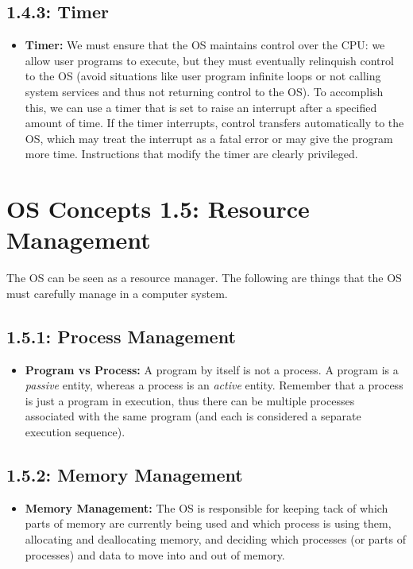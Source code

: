 \documentclass[12pt]{article}
\begin{document}
\subsection*{1.4.3: Timer}

\begin{itemize}
    \item \textbf{Timer:} We must ensure that the OS maintains control over the CPU: we allow user programs to execute, but they must eventually relinquish control to the OS (avoid situations like user program infinite loops or not calling system services and thus not returning control to the OS). To accomplish this, we can use a timer that is set to raise an interrupt after a specified amount of time. If the timer interrupts, control transfers automatically to the OS, which may treat the interrupt as a fatal error or may give the program more time. Instructions that modify the timer are clearly privileged.
\end{itemize}

\section*{OS Concepts 1.5: Resource Management}

The OS can be seen as a resource manager. The following are things that the OS must carefully manage in a computer system.

\subsection*{1.5.1: Process Management}

\begin{itemize}
    \item \textbf{Program vs Process:} A program by itself is not a process. A program is a \textit{passive} entity, whereas a process is an \textit{active} entity. Remember that a process is just a program in execution, thus there can be multiple processes associated with the same program (and each is considered a separate execution sequence).
\end{itemize}

\subsection*{1.5.2: Memory Management}

\begin{itemize}
    \item \textbf{Memory Management:} The OS is responsible for keeping tack of which parts of memory are currently being used and which process is using them, allocating and deallocating memory, and deciding which processes (or parts of processes) and data to move into and out of memory.
\end{itemize}
\end{document}
